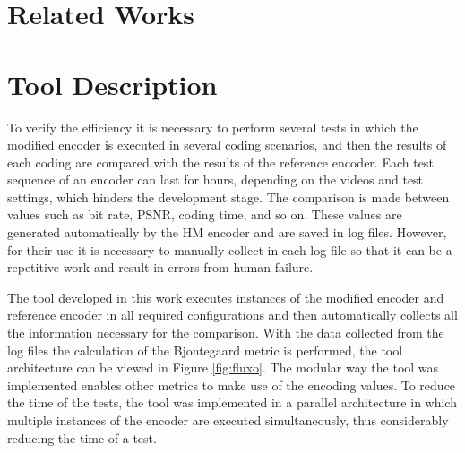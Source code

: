 \documentclass{acm_proc_article-sp}
\begin{document}




\section{Related Works}

	
	
\section{Tool Description}

To verify the efficiency it is necessary to perform several tests in which the modified encoder is executed in several coding scenarios, and then the results of each coding are compared with the results of the reference encoder. Each test sequence of an encoder can 
last for hours, depending on the videos and test settings, which hinders the development stage. The comparison is made between values such as bit rate, PSNR, coding time, and so on. These values are generated automatically by the HM encoder and are saved in log files. However, 
for their use it is necessary to manually collect in each log file so that it can be a repetitive work and result in errors from human failure. 

The tool developed in this work executes instances of the modified encoder and reference encoder in all required configurations and then automatically collects all the information necessary for the comparison. With the data collected from the log files the calculation of 
the Bjontegaard \cite{Bjontegaard} metric is performed, the tool architecture can be viewed in Figure \ref{fig:fluxo}. The modular way the tool was implemented enables other metrics to make use of the encoding values. To reduce the time of the tests, the tool was implemented in a parallel architecture in which multiple instances of the encoder are executed simultaneously, thus considerably reducing the time of a test.
\end{document}
